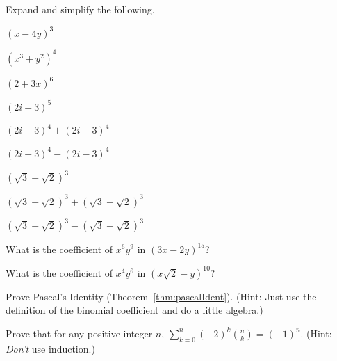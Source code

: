 \begin{pro}
Expand and simplify the following.
\begin{lenum}
\item $(x - 4y)^3$ 
\item $(x^3 + y^2)^4$ 
\item $(2 + 3x)^6$ 
\item $(2i - 3)^5$ 
\item $(2i + 3)^4 + (2i - 3)^4$ 
\item $(2i + 3)^4 - (2i - 3)^4$ 
\item $(\sqrt{3} - \sqrt{2})^3$ 
\item $(\sqrt{3} +\sqrt{2})^3 + (\sqrt{3} - \sqrt{2})^3$ 
\item $(\sqrt{3} +\sqrt{2})^3 - (\sqrt{3} - \sqrt{2})^3$
\end{lenum}
\end{pro}

\begin{pro}
What is the coefficient of $x^6y^9$ in $(3x-2y)^{15}$?
\end{pro}
\begin{pro} What is the coefficient of $x^4 y^6$ in $(x\sqrt{2} - y)^{10}?$
\end{pro}

\begin{pro}\label{pro:pascident}
Prove Pascal's Identity (Theorem~\ref{thm:pascalIdent}).
(Hint: Just use the definition of the binomial coefficient and do a little algebra.)
\end{pro}

\begin{pro}
Prove that for any positive integer $n$, $\displaystyle \sum_{k=0}^n(-2)^k \binom{n}{k} = (-1)^n$.
(Hint: {\em Don't} use induction.)
\end{pro}

%



